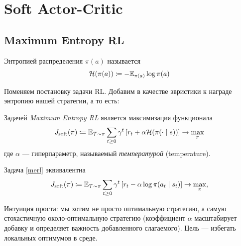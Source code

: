 \section{Soft Actor-Critic}\label{SACsection}

\subsection{Maximum Entropy RL}\label{maximumentropyrlsubsection}

\begin{definition}
Энтропией распределения $\pi(a)$ называется
$$\mathcal{H}(\pi(a)) \coloneqq - \mathbb{E}_{\pi(a)} \log \pi(a)$$
\end{definition}

Поменяем постановку задачи RL. Добавим в качестве эвристики к награде энтропию нашей стратегии, а то есть:

\begin{definition}
Задачей \emph{Maximum Entropy RL} является максимизация функционала
\begin{equation}\label{merl}
    J_{\mathrm{soft}}(\pi) \coloneqq \mathbb{E}_{\mathcal{T} \sim \pi} \sum_{t \ge 0} \gamma^t \left[ r_t + \alpha \mathcal{H}(\pi(\cdot \mid s)) \right] \to \max_\pi
\end{equation}
где $\alpha$ --- гиперпараметр, называемый \emph{температурой} (temperature).
\end{definition}

\begin{proposition}
Задача \eqref{merl} эквивалентна
\begin{equation*}
    J_{\mathrm{soft}}(\pi) \coloneqq \mathbb{E}_{\mathcal{T} \sim \pi} \sum_{t \ge 0} \gamma^t \left[ r_t - \alpha \log \pi(a_t \mid s_t) \right] \to \max_\pi,
\end{equation*}
\end{proposition}

Интуиция проста: мы хотим не просто оптимальную стратегию, а самую стохастичную около-оптимальную стратегию (коэффициент $\alpha$ масштабирует добавку и определяет важность добавленного слагаемого). Цель --- избегать локальных оптимумов в среде. 

